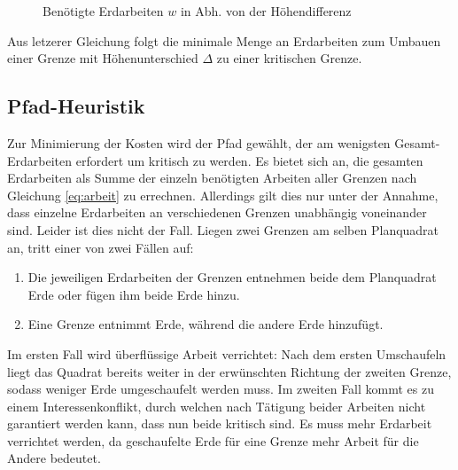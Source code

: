 \documentclass[a4paper, 12pt]{scrartcl}
\begin{document}
\begin{figure}[H]
	\centering
	\caption{Benötigte Erdarbeiten $w$ in Abh. von der Höhendifferenz}
\end{figure}
Aus letzerer Gleichung folgt die minimale Menge an Erdarbeiten zum Umbauen einer Grenze mit Höhenunterschied $\Delta$ zu einer kritischen Grenze.
\subsection{Pfad-Heuristik}
\label{subsec:heuristik}
Zur Minimierung der Kosten wird der Pfad gewählt, der am wenigsten Gesamt-Erdarbeiten erfordert um kritisch zu werden. Es bietet sich an, die gesamten Erdarbeiten als Summe der einzeln benötigten Arbeiten aller Grenzen nach Gleichung \eqref{eq:arbeit} zu errechnen. Allerdings gilt dies nur unter der Annahme, dass einzelne Erdarbeiten an verschiedenen Grenzen unabhängig voneinander sind. Leider ist dies nicht der Fall. Liegen zwei Grenzen am selben Planquadrat an, tritt einer von zwei Fällen auf:
\begin{enumerate}
	\item Die jeweiligen Erdarbeiten der Grenzen entnehmen beide dem Planquadrat Erde oder fügen ihm beide Erde hinzu.
	\item Eine Grenze entnimmt Erde, während die andere Erde hinzufügt.
\end{enumerate}
Im ersten Fall wird überflüssige Arbeit verrichtet: Nach dem ersten Umschaufeln liegt das Quadrat bereits weiter in der erwünschten Richtung der zweiten Grenze, sodass weniger Erde umgeschaufelt werden muss. Im zweiten Fall kommt es zu einem Interessenkonflikt, durch welchen nach Tätigung beider Arbeiten nicht garantiert werden kann, dass nun beide kritisch sind. Es muss mehr Erdarbeit verrichtet werden, da geschaufelte Erde für eine Grenze mehr Arbeit für die Andere bedeutet.
\end{document}
